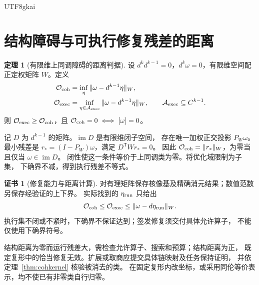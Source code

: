 \documentclass[12pt]{report}
\makeatletter
\theoremstyle{definition}
\newtheorem{theorem}{定理}[chapter]
\newtheorem{Certificate}{证书}[chapter]
\renewenvironment{proof}[1][\proofname]{\par
  \pushQED{\qed}\normalfont
  \topsep6\p@\@plus6\p@\relax
  \trivlist
  \item[\hskip\labelsep\normalfont #1\@addpunct{.}]\ignorespaces
}{
  \popQED\endtrivlist\@endpefalse
}
\newcommand{\im}{\operatorname{im}}
\makeatother
\begin{document}
\begin{CJK*}{UTF8}{gkai}
\section{结构障碍与可执行修复残差的距离}
\begin{theorem}[有限维上同调障碍的距离判据]
\label{thm:cohomological-distance}
设 \(d^{k}d^{k-1}=0\)，\(d^k\omega=0\)，有限维空间配正定权矩阵 \(W\)。定义
\[
\begin{aligned}
\mathcal O_{\rm coh}&=\inf_\eta\|\omega-d^{k-1}\eta\|_W,\\
\mathcal O_{\rm exec}&=\inf_{\eta\in\mathcal A_{\rm exec}}
\|\omega-d^{k-1}\eta\|_W,\qquad
\mathcal A_{\rm exec}\subseteq C^{k-1}.
\end{aligned}
\]
则 \(\mathcal O_{\rm exec}\ge\mathcal O_{\rm coh}\)，且
\(\mathcal O_{\rm coh}=0\iff[\omega]=0\)。
\end{theorem}
\begin{proof}
记 \(D\) 为 \(d^{k-1}\) 的矩阵。\(\im D\) 是有限维闭子空间，
存在唯一加权正交投影 \(P_W\omega\)。最小残差是
\(r_*=(I-P_W)\omega\)，满足 \(D^{\mathsf T}Wr_*=0\)。
因此 \(\mathcal O_{\rm coh}=\|r_*\|_W\)，为零当且仅当 \(\omega\in\im D\)。
闭性使这一条件等价于上同调类为零。将优化域限制为子集，
下确界不减，得到执行残差不等式。
\end{proof}
\begin{Certificate}[修复能力与距离计算]
对有理矩阵保存核像基及精确消元结果；数值范数另保存经验证的上下界。
实际找到的 \(\eta_{\rm run}\) 只给出
\[
\mathcal O_{\rm coh}\le\mathcal O_{\rm exec}
\le\|\omega-d\eta_{\rm run}\|_W.
\]
执行集不闭或不紧时，下确界不保证达到；签发修复须交付具体允许算子，
不能仅使用下确界符号。
\end{Certificate}
结构距离为零而运行残差大，需检查允许算子、搜索和预算；结构距离为正，
既定复形中的恰当修复无效。扩展或取商应提交具体链映射及任务保持证明，
并依定理~\ref{thm:cohkernel} 核验被消去的类。
在固定复形内改坐标，或采用同伦等价表示，均不使已有非零类自行归零。


\end{CJK*}
\end{document}
